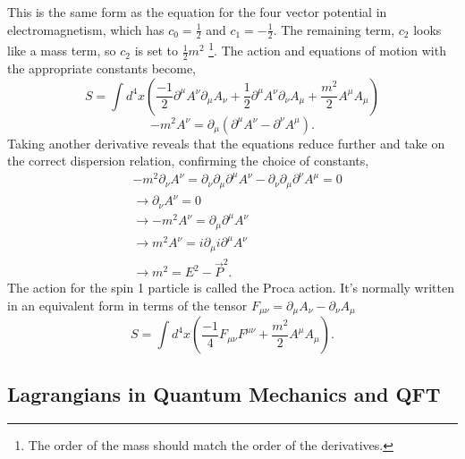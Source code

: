 \documentclass[12pt]{article}
\begin{document}
This is the same form as the equation for the four vector potential in electromagnetism, which has $c_0 = \frac{1}{2}$ and $c_1 =-\frac{1}{2}$. The remaining term, $c_2$ looks like a mass term, so $c_2$ is set to $\frac{1}{2}m^2$ \footnote{The order of the mass should match the order of the derivatives.}. The action and equations of motion with the appropriate constants become, 
\begin{equation}
S = \int d^4x \left( \frac{-1}{2} \partial^\mu A^\nu\partial_\mu A_\nu + \frac{1}{2} \partial^\mu A^\nu\partial_\nu A_\mu + \frac{m^2}{2} A^\mu A_\mu \right)
\end{equation}
\begin{equation}
-m^2 A^\nu = \partial_\mu\left(\partial^\mu A^\nu - \partial^\nu A^\mu\right).
\end{equation}
Taking another derivative reveals that the equations reduce further and take on the correct dispersion relation, confirming the choice of constants,
\begin{equation}
\begin{split}
&-m^2 \partial_\nu A^\nu = \partial_\nu \partial_\mu \partial^\mu A^\nu - \partial_\nu \partial_\mu \partial^\nu A^\mu = 0 \\
&\rightarrow \partial_\nu A^\nu = 0 \\
&\rightarrow -m^2 A^\nu = \partial_\mu\partial^\mu A^\nu \\
&\rightarrow m^2 A^\nu = i\partial_\mu i\partial^\mu A^\nu \\
&\rightarrow m^2 = E^2 - \vec{P}^2.
\end{split}
\end{equation}
The action for the spin 1 particle is called the Proca action. It's normally written in an equivalent form in terms of the tensor $F_{\mu\nu} = \partial_\mu A_\nu - \partial_\nu A_\mu$
\begin{equation}
S = \int d^4x \left( \frac{-1}{4}F_{\mu\nu}F^{\mu\nu}  + \frac{m^2}{2} A^\mu A_\mu \right).
\end{equation}

\subsection{Lagrangians in Quantum Mechanics and QFT}
\end{document}
